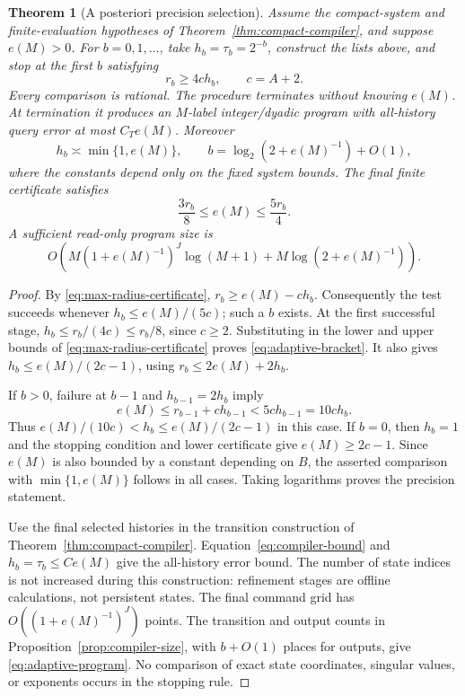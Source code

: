 \documentclass[11pt]{amsart}
\newtheorem{theorem}{Theorem}[section]
\theoremstyle{definition}\newtheorem{definition}[theorem]{Definition}
\theoremstyle{remark}\newtheorem{remark}[theorem]{Remark}
\begin{document}
\begin{theorem}[A posteriori precision selection]
\label{thm:adaptive-compiler}
Assume the compact-system and finite-evaluation hypotheses of
Theorem~\ref{thm:compact-compiler}, and suppose $e(M)>0$.
For $b=0,1,\ldots$, take $h_b=\tau_b=2^{-b}$, construct the lists
above, and stop at the first $b$ satisfying
\begin{equation}\label{eq:adaptive-stop}
 r_b\ge4c h_b,\qquad c=A+2.
\end{equation}
Every comparison is rational. The procedure terminates without knowing
$e(M)$. At termination it produces an $M$-label integer/dyadic program
with all-history query error at most $C_T e(M)$. Moreover
\begin{equation}\label{eq:adaptive-scale}
 h_b\asymp\min\{1,e(M)\},\qquad
 b=\log_2(2+e(M)^{-1})+O(1),
\end{equation}
where the constants depend only on the fixed system bounds. The final
finite certificate satisfies
\begin{equation}\label{eq:adaptive-bracket}
 \frac{3r_b}{8}\le e(M)\le\frac{5r_b}{4}.
\end{equation}
A sufficient read-only program size is
\begin{equation}\label{eq:adaptive-program}
 O\!\left(M(1+e(M)^{-1})^J\log(M+1)
                +M\log(2+e(M)^{-1})\right).
\end{equation}
\end{theorem}
\begin{proof}
By \eqref{eq:max-radius-certificate}, $r_b\ge e(M)-ch_b$.
Consequently the test succeeds whenever $h_b\le e(M)/(5c)$;
such a $b$ exists. At the first successful stage,
$h_b\le r_b/(4c)\le r_b/8$, since $c\ge2$.
Substituting in the lower and upper bounds of
\eqref{eq:max-radius-certificate} proves \eqref{eq:adaptive-bracket}.
It also gives $h_b\le e(M)/(2c-1)$, using
$r_b\le2e(M)+2h_b$.

If $b>0$, failure at $b-1$ and $h_{b-1}=2h_b$ imply
\[
 e(M)\le r_{b-1}+ch_{b-1}<5ch_{b-1}=10ch_b.
\]
Thus $e(M)/(10c)<h_b\le e(M)/(2c-1)$ in this case. If $b=0$,
then $h_b=1$ and the stopping condition and lower certificate give
$e(M)\ge2c-1$. Since $e(M)$ is also bounded by a constant depending
on $B$, the asserted comparison with $\min\{1,e(M)\}$ follows in
all cases. Taking logarithms proves the precision statement.

Use the final selected histories in the transition construction of
Theorem~\ref{thm:compact-compiler}. Equation~\eqref{eq:compiler-bound}
and $h_b=\tau_b\le C e(M)$ give the all-history error bound. The
number of state indices is not increased during this construction:
refinement stages are offline calculations, not persistent states.
The final command grid has $O((1+e(M)^{-1})^J)$ points. The transition
and output counts in Proposition~\ref{prop:compiler-size}, with
$b+O(1)$ places for outputs, give \eqref{eq:adaptive-program}.
No comparison of exact state coordinates, singular values, or exponents
occurs in the stopping rule.
\end{proof}
\end{document}
